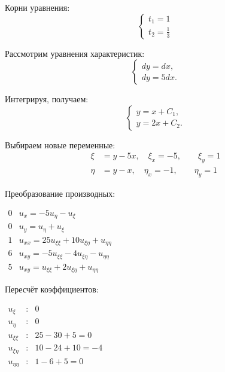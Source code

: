 \documentclass[a4paper,12pt]{article}
\begin{document}
Корни уравнения:
\begin{equation*}
    \begin{cases}
    t_1 = 1 \\
    t_2 = \frac{1}{3}
    \end{cases}
\end{equation*}

Рассмотрим уравнения характеристик:
\[
\begin{cases}
    dy = dx, \\
    dy = 5dx.
\end{cases}
\]

Интегрируя, получаем:
\[
\begin{cases}
    y = x + C_1, \\
    y = 2x + C_2.
\end{cases}
\]

Выбираем новые переменные:
\begin{align*}
    \xi &= y - 5x, \quad \xi_x = -5,  \quad \quad \xi_y = 1 \\
    \eta &= y - x, \quad \eta_x =- 1,  \quad \quad \eta_y = 1
\end{align*}

Преобразование производных:
\begin{flushleft}
\(
\begin{array}{r|l}
0 & u_x = -5u_{\eta} - u_{\xi} \\
0 & u_y = u_{\eta} + u_{\xi} \\
1 & u_{xx} = 25 u_{\xi\xi} + 10u_{\xi\eta} + u_{\eta\eta}\\
6 & u_{xy} = -5 u_{\xi\xi} - 4u_{\xi\eta} - u_{\eta\eta}\\
5 & u_{xy} = u_{\xi\xi} + 2 u_{\xi\eta}+u_{\eta\eta}
\end{array}
\)
\end{flushleft}

Пересчёт коэффициентов:
\begin{flushleft}
\(
\begin{array}{rcl}
u_{\xi} & : & 0 \\
u_{\eta} & : & 0 \\
u_{\xi\xi} & : & 25 - 30 + 5 = 0\\
u_{\xi\eta} & : & 10 -24 + 10 = -4\\
u_{\eta\eta} & : &  1 - 6 + 5 = 0
\end{array}
\)
\end{flushleft}
\end{document}
